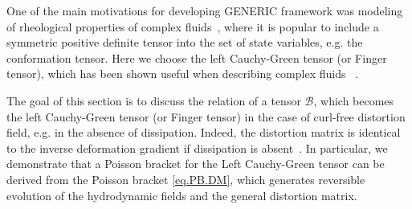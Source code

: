 \documentclass[twoside]{article}
\newcommand{\BBBB}{{\bm{\mathcal{B}}}}
\begin{document}
One of the main motivations for developing GENERIC framework was 
modeling of rheological properties of 
complex fluids~\cite{GrmelaOttingerI,GrmelaOttingerII}, 
where it is popular to include a symmetric positive definite tensor into the
set of state variables, e.g. the conformation tensor. Here we choose the 
left Cauchy-Green tensor (or Finger tensor), which has been shown useful when describing
complex fluids ~\cite{Rajagopal-B,Malek-B,Hron-B}. 

The goal of this section is to discuss the 
relation of a tensor $\BBBB$,
which becomes the left Cauchy-Green tensor (or Finger tensor)
in the case of curl-free distortion field, e.g. in the absence of dissipation. 
Indeed, the distortion matrix is 
identical to the inverse deformation gradient if dissipation is 
absent~\cite{GodRom2003}. In particular, we demonstrate that a Poisson bracket 
for the Left Cauchy-Green tensor can be derived from the Poisson bracket 
\eqref{eq.PB.DM}, which generates reversible evolution of the hydrodynamic 
fields and the general distortion matrix.
\end{document}
